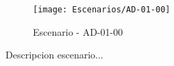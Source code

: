 \begin{figure}[H]
\centering
\texttt{[image: Escenarios/AD-01-00]}
\caption{Escenario - AD-01-00}
\label{fig:AD-01-00}
\end{figure}

Descripcion escenario...
\clearpage
